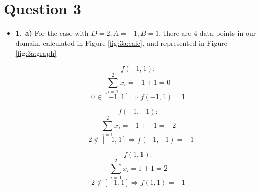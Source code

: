 \documentclass[12pt]{article}
\begin{document}
\section*{Question 3}
\begin{itemize}
    \item \textbf{1. a)} For the case with $D=2, A=-1, B=1$, there are 4 data points in our domain, calculated in Figure \ref{fig:3a:calc}, and represented in Figure \ref{fig:3a:graph}

          \begin{figure}[H]
              \begin{minipage}{0.5\linewidth}
                  \begin{equation*}
                      f(-1, 1):
                  \end{equation*}
                  \begin{equation*}
                      \sum_{i=1}^{2} x_i = -1 + 1 = 0
                  \end{equation*}
                  \begin{equation*}
                      0 \in [-1, 1] \Rightarrow f(-1, 1) = 1
                  \end{equation*}

                  \begin{equation*}
                      f(-1, -1):
                  \end{equation*}
                  \begin{equation*}
                      \sum_{i=1}^{2} x_i = -1 + -1 = -2
                  \end{equation*}
                  \begin{equation*}
                      -2 \notin [-1, 1] \Rightarrow f(-1, -1) = -1
                  \end{equation*}
              \end{minipage}
              \begin{minipage}{0.5\linewidth}
                  \begin{equation*}
                      f(1, 1):
                  \end{equation*}
                  \begin{equation*}
                      \sum_{i=1}^{2} x_i = 1 + 1 = 2
                  \end{equation*}
                  \begin{equation*}
                      2 \notin [-1, 1] \Rightarrow f(1, 1) = -1
                  \end{equation*}


\end{minipage}
\end{figure}
\end{itemize}
\end{document}
